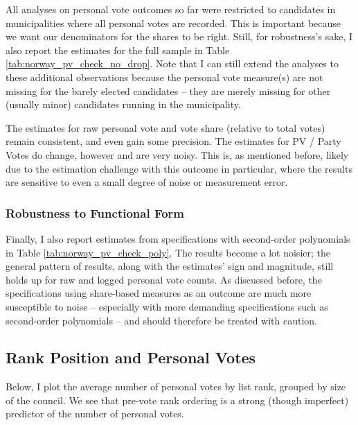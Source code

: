 \documentclass[12pt]{article}
\begin{document}
All analyses on personal vote outcomes so far were restricted to candidates in municipalities where all personal votes are recorded. This is important because we want our denominators for the shares to be right.  Still, for robustness's sake, I also report the estimates for the full sample in Table \ref{tab:norway_pv_check_no_drop}. Note that I can still extend the analyses to these additional observations because the personal vote measure(s) are not missing for the barely elected candidates -- they are merely missing for other (usually minor) candidates running in the municipality.

The estimates for raw personal vote and vote share (relative to total votes) remain consistent, and even gain some precision. The estimates for PV / Party Votes do change, however and are very noisy. This is, as mentioned before, likely due to the estimation challenge with this outcome in particular, where the results are sensitive to even a small degree of noise or measurement error.



\clearpage
\subsubsection{Robustness to Functional Form}

Finally, I also report estimates from specifications with second-order polynomials in Table \ref{tab:norway_pv_check_poly}. The results become a lot noisier; the general pattern of results, along with the estimates' sign and magnitude, still holds up for raw and logged personal vote counts. As discussed before, the specifications using share-based measures as an outcome are much more susceptible to noise -- especially with more demanding specifications such as second-order polynomials -- and should therefore be treated with caution.



\clearpage
\subsection{Rank Position and Personal Votes}
\label{app:pv_by_rank}

Below, I plot the average number of personal votes by list rank, grouped by size of the council. We see that pre-vote rank ordering is a strong (though imperfect) predictor of the number of personal votes.
\end{document}
